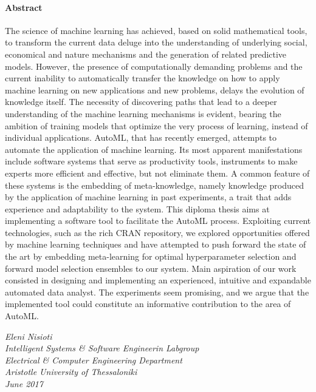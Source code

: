 {	\paragraph{Abstract}
	The science of machine learning has achieved, based on solid mathematical tools, to transform the current data deluge into the under\-standing of underlying social, economical and nature mechanisms and the generation of related predictive models. However, the presence of computa\-tionally demanding problems and the current inability to automatically transfer the knowledge on how to apply machine learning on new applications and new problems, delays the evolution of knowledge itself. The necessity of discovering paths that lead to a deeper understanding of the machine learning mecha\-nisms is evident, bearing the ambition of training models that optimize the very process of learning, instead of individual applications. \gls{AutoML}, that has recently emerged, attempts to automate the application of machine learning. Its most apparent manifestations  include software systems that serve as productivity tools, instruments to make experts more efficient and effective, but not eliminate them. A common feature of these systems is the embedding of meta-knowledge, namely knowledge produced by the application of machine learning in past experi\-ments, a trait that adds experience and adaptability to the system. This diploma thesis aims at implementing a software tool to facilitate the AutoML process. Exploiting current technologies, such as the rich CRAN repository, we explored opportunities offered by machine learning techni\-ques and have attempted to push forward the state of the art by embedding meta-learning for optimal hyperparameter selection and forward model selection ensembles to our system. Main aspiration of our work consisted in designing and implementing an experien\-ced, intuitive and expandable automated data analyst. The experiments  seem promising, and we argue that the implemented tool could constitute an informa\-tive contribu\-tion to the area of \gls{AutoML}.       
	
	\vspace{2cm}
	
	\begin{flushleft}
		\textit{Eleni Nisioti \\
		Intelligent Systems \& Software Engineerin Labgroup\\
		Electrical \& Computer Engineering Department\\
		Aristotle University of Thessaloniki\\
		June 2017}
	\end{flushleft}
	
}
